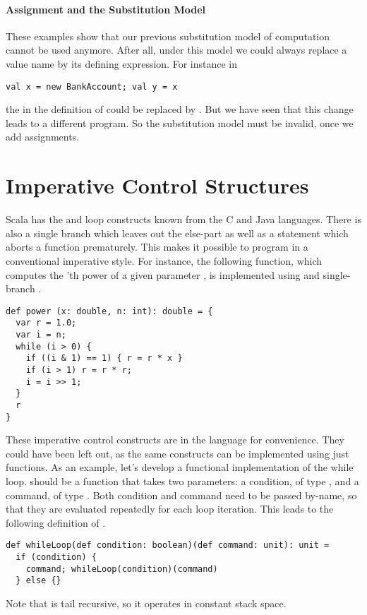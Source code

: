 \documentclass[a4paper,12pt,twoside,titlepage]{book}
\begin{document}
{\paragraph{Assignment and the Substitution Model}
These examples show that our previous substitution model of
computation cannot be used anymore.  After all, under this
model we could always replace a value name by its
defining expression.
For instance in
\begin{lstlisting}
val x = new BankAccount; val y = x
\end{lstlisting}
the  in the definition of  could
be replaced by .
But we have seen that this change leads to a different program.
So the substitution model must be invalid, once we add assignments. 

\section{Imperative Control Structures}

Scala has the  and  loop constructs known
from the C and Java languages. There is also a single branch 
which leaves out the else-part as well as a  statement which
aborts a function prematurely. This makes it possible to program in a
conventional imperative style. For instance, the following function,
which computes the 'th power of a given parameter , is
implemented using  and single-branch .
\begin{lstlisting}
def power (x: double, n: int): double = {
  var r = 1.0;
  var i = n;
  while (i > 0) { 
    if ((i & 1) == 1) { r = r * x }
    if (i > 1) r = r * r;
    i = i >> 1;
  }
  r
}
\end{lstlisting}
These imperative control constructs are in the language for
convenience. They could have been left out, as the same constructs can
be implemented using just functions. As an example, let's develop a
functional implementation of the while loop.  should
be a function that takes two parameters: a condition, of type
, and a command, of type . Both condition and
command need to be passed by-name, so that they are evaluated
repeatedly for each loop iteration.  This leads to the following
definition of .
\begin{lstlisting}
def whileLoop(def condition: boolean)(def command: unit): unit = 
  if (condition) {
    command; whileLoop(condition)(command)
  } else {}
\end{lstlisting}
Note that  is tail recursive, so it operates in
constant stack space.

}
\end{document}

